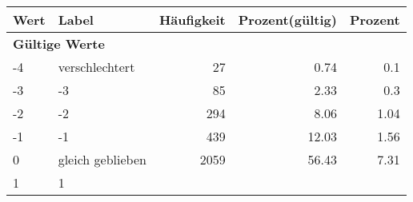      \begin{longtable}{lXrrr}
     \toprule
     \textbf{Wert} & \textbf{Label} & \textbf{Häufigkeit} & \textbf{Prozent(gültig)} & \textbf{Prozent} \\
     \endhead
     \midrule
     \multicolumn{5}{l}{\textbf{Gültige Werte}}\\

     -4 &
     \multicolumn{1}{X}{ verschlechtert   } &


       \num{27} &
       \num[round-mode=places,round-precision=2]{0,74} &
         \num[round-mode=places,round-precision=2]{0,1} \\

     -3 &
     \multicolumn{1}{X}{ -3   } &


       \num{85} &
       \num[round-mode=places,round-precision=2]{2,33} &
         \num[round-mode=places,round-precision=2]{0,3} \\

     -2 &
     \multicolumn{1}{X}{ -2   } &


       \num{294} &
       \num[round-mode=places,round-precision=2]{8,06} &
         \num[round-mode=places,round-precision=2]{1,04} \\

     -1 &
     \multicolumn{1}{X}{ -1   } &


       \num{439} &
       \num[round-mode=places,round-precision=2]{12,03} &
         \num[round-mode=places,round-precision=2]{1,56} \\

     0 &
     \multicolumn{1}{X}{ gleich geblieben   } &


       \num{2059} &
       \num[round-mode=places,round-precision=2]{56,43} &
         \num[round-mode=places,round-precision=2]{7,31} \\

     1 &
     \multicolumn{1}{X}{ 1   } &



\end{longtable}
